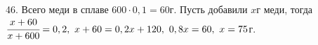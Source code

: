 46. Всего меди в сплаве $600\cdot0,1=60$г. Пусть добавили $x$г меди, тогда $\cfrac{x+60}{x+600}=0,2,\ x+60=0,2x+120,\ 0,8x=60,\ x=75$г.\\
